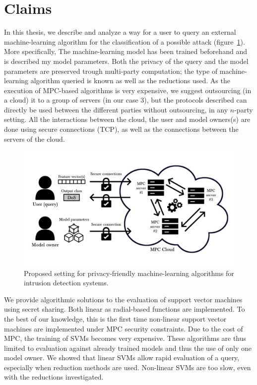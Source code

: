 \section{Claims}
In this thesis, we describe and analyze a way for a user to query an external machine-learning algorithm for the classification of a possible attack (figure~\ref{fig:eval-model}). More specifically, The machine-learning model has been trained beforehand and is described my model parameters. Both the privacy of the query and the model parameters are preserved trough multi-party computation; the type of machine-learning algorithm queried is known as well as the reductions used. As the execution of MPC-based algorithms is very expensive, we suggest outsourcing (in a cloud) it to a group of servers (in our case 3), but the protocols described can directly be used between the different parties without outsourcing, in any $n$-party setting. All the interactions between the cloud, the user and model owners(s) are done using secure connections (TCP), as well as the connections between the servers of the cloud.

\begin{figure}
    \centering
    \includegraphics[width=.95\textwidth]{parts/chap-1/img-1/eval-model.jpg}
    \caption[Proposed setting]{Proposed setting for privacy-friendly machine-learning algorithms for intrusion detection systems.} 
    \label{fig:eval-model}
\end{figure}

We provide algorithmic solutions to the evaluation of support vector machines using secret sharing. Both linear as radial-based functions are implemented. To the best of our knowledge, this is the first time non-linear support vector machines are implemented under MPC security constraints. Due to the cost of MPC, the training of SVMs becomes very expensive. These algorithms are thus limited to evaluation against already trained models and thus the use of only one model owner. We showed that linear SVMs allow rapid evaluation of a query, especially when reduction methods are used. Non-linear SVMs are too slow, even with the reductions investigated.

